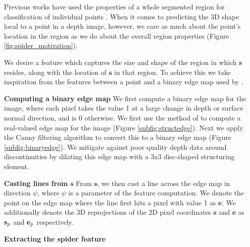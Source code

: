\documentclass[10pt,twocolumn,letterpaper]{article}
\newcommand{\pixelidx}{\mathbf{s}}
\newcommand{\edgeimidx}{\mathbf{e}}
\newcommand{\point}{\mathbf{p}}
\renewcommand{\paragraph}{\vspace{2pt}\noindent\textbf}
\begin{document}
Previous works have used the properties of a whole segmented region for classification of individual points \cite{golovinskiy-iccv-2009}.
When it comes to predicting the 3D shape local to a point in a depth image, however, we care as much about the point's location in the region as we do about the overall region properties (Figure \ref{fig:spider_motivation}).

We desire a feature which captures the size and shape of the region in which $\pixelidx$ resides, along with the location of $\pixelidx$ in that region.
To achieve this we take inspiration from the features between a point and a binary edge map used by \cite{drost-3dimpvt-2012}.

\paragraph{Computing a binary edge map}
We first compute a binary edge map for the image, where each pixel takes the value 1 at a large change in depth or surface normal direction, and is 0 otherwise.
We first use the method of \cite{dollar-iccv-2013} to compute a real-valued edge map for the image (Figure \ref{subfig:structedge}).
Next we apply the Canny filtering algorithm \cite{canny-pami-1986} to convert this to a binary edge map (Figure \ref{subfig:binaryedge}).
We mitigate against poor quality depth data around discontinuities by dilating this edge map with a 3x3 disc-shaped structuring element.



\paragraph{Casting lines from $\pixelidx$}
From $\pixelidx$, we then cast a line across the edge map in direction $\psi$, where $\psi$ is a parameter of the feature computation.
We denote the point on the edge map where the line first hits a pixel with value 1 as $\edgeimidx$.
We additionally denote the 3D reprojections of the 2D pixel coordinates $\pixelidx$ and $\edgeimidx$ as $\pointthreed$ and $\edgethreed$ respectively.

\paragraph{Extracting the spider feature}
\end{document}
